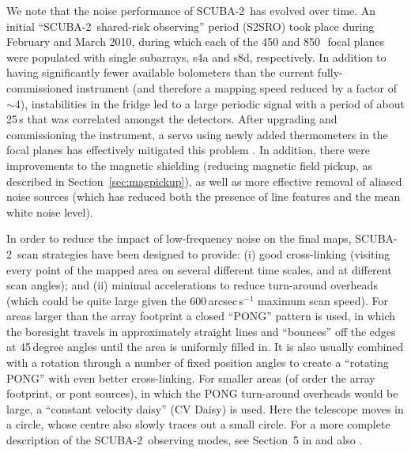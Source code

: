 \documentclass[useAMS,usenatbib,nofootinbib]{mn2e}
\newcommand{\scuba}{SCUBA-2}
\begin{document}
We note that the noise performance of \scuba\ has evolved over
time. An initial ``\scuba\ shared-risk observing'' period (S2SRO) took
place during February and March 2010, during which each of the 450 and
850\,\micron\ focal planes were populated with single subarrays, s4a
and s8d, respectively. In addition to having significantly fewer
available bolometers than the current fully-commissioned instrument
(and therefore a mapping speed reduced by a factor of $\sim$4),
instabilities in the fridge led to a large periodic signal with a
period of about 25\,s that was correlated amongst the detectors. After
upgrading and commissioning the instrument, a servo using newly added
thermometers in the focal planes has effectively mitigated this
problem \citep[Section~2.5 in][]{holland2012}. In addition, there were
improvements to the magnetic shielding (reducing magnetic field
pickup, as described in Section~\ref{sec:magpickup}), as well as more
effective removal of aliased noise sources (which has reduced both the
presence of line features and the mean white noise level).

In order to reduce the impact of low-frequency noise on the final
maps, \scuba\ scan strategies have been designed to provide: (i) good
cross-linking (visiting every point of the mapped area on several
different time scales, and at different scan angles); and (ii) minimal
accelerations to reduce turn-around overheads (which could be quite
large given the 600\,arcsec\,s$^{-1}$ maximum scan speed). For areas
larger than the array footprint a closed ``PONG'' pattern is used, in
which the boresight travels in approximately straight lines and
``bounces'' off the edges at 45\,degree angles until the area is
uniformly filled in. It is also usually combined with a rotation
through a number of fixed position angles to create a ``rotating
PONG'' with even better cross-linking. For smaller areas (of order the
array footprint, or pont sources), in which the PONG turn-around
overheads would be large, a ``constant velocity daisy'' (CV Daisy) is
used.  Here the telescope moves in a circle, whose centre also slowly
traces out a small circle. For a more complete description of the
\scuba\ observing modes, see Section~5 in \citet{holland2012} and also
\citet{2010SPIE.7740E..66K}.
\end{document}
